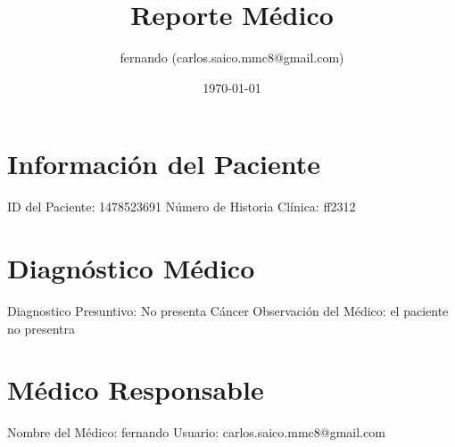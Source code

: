 \documentclass{article}%
\title{Reporte Médico}%
\author{fernando (carlos.saico.mmc8@gmail.com)}%
\date{\today}%
\begin{document}
%
\normalsize%
\maketitle%
\section{Información del Paciente}%
\label{sec:InformacindelPaciente}%
ID del Paciente: 1478523691\newline%
%
Número de Historia Clínica: ff2312\newline%

%
\section{Diagnóstico Médico}%
\label{sec:DiagnsticoMdico}%
Diagnostico Presuntivo: No presenta Cáncer\newline%
%
Observación del Médico:\newline%
el paciente no presentra\newline%

%
\section{Médico Responsable}%
\label{sec:MdicoResponsable}%
Nombre del Médico: fernando\newline%
%
Usuario: carlos.saico.mmc8@gmail.com\newline%

%
\end{document}
